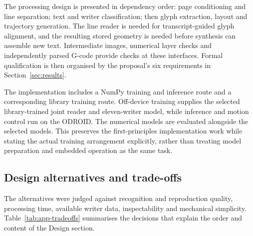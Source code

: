 The processing design is presented in dependency order: page conditioning and line separation; text and writer classification; then glyph extraction, layout and trajectory generation. The line reader is needed for transcript-guided glyph alignment, and the resulting stored geometry is needed before synthesis can assemble new text. Intermediate images, numerical layer checks and independently parsed G-code provide checks at these interfaces. Formal qualification is then organised by the proposal's six requirements in Section~\ref{sec:results}.

The implementation includes a NumPy training and inference route and a corresponding library training route. Off-device training supplies the selected library-trained joint reader and eleven-writer model, while inference and motion control run on the ODROID. The numerical models are evaluated alongside the selected models. This preserves the first-principles implementation work while stating the actual training arrangement explicitly, rather than treating model preparation and embedded operation as the same task.

\subsection{Design alternatives and trade-offs}
\label{sec:app-alternatives}
The alternatives were judged against recognition and reproduction quality, processing time, available writer data, inspectability and mechanical simplicity. Table~\ref{tab:app-tradeoffs} summarises the decisions that explain the order and content of the Design section.

